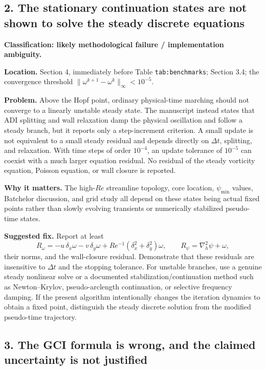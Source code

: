 \documentclass[11pt]{article}
\begin{document}
\subsection*{2. The stationary continuation states are not shown to solve the steady discrete equations}

\textbf{Classification: likely methodological failure / implementation ambiguity.}

\textbf{Location.} Section 4, immediately before Table \texttt{tab:benchmarks}; Section 3.4; the convergence threshold
$\|\omega^{k+1}-\omega^k\|_\infty<10^{-5}$.

\textbf{Problem.} Above the Hopf point, ordinary physical-time marching should not converge to a linearly unstable steady state.  The manuscript instead states that ADI splitting and wall relaxation damp the physical oscillation and follow a steady branch, but it reports only a step-increment criterion.  A small update is not equivalent to a small steady residual and depends directly on $\Delta t$, splitting, and relaxation.  With time steps of order $10^{-4}$, an update tolerance of $10^{-5}$ can coexist with a much larger equation residual.  No residual of the steady vorticity equation, Poisson equation, or wall closure is reported.

\textbf{Why it matters.} The high-$Re$ streamline topology, core location, $\psi_{\min}$ values, Batchelor discussion, and grid study all depend on these states being actual fixed points rather than slowly evolving transients or numerically stabilized pseudo-time states.

\textbf{Suggested fix.} Report at least
\[
R_\omega=-u\,\delta_x\omega-v\,\delta_y\omega
             +Re^{-1}(\delta_x^2+\delta_y^2)\omega,
\qquad
R_\psi=\nabla_h^2\psi+\omega,
\]
their norms, and the wall-closure residual.  Demonstrate that these residuals are insensitive to $\Delta t$ and the stopping tolerance.  For unstable branches, use a genuine steady nonlinear solve or a documented stabilization/continuation method such as Newton--Krylov, pseudo-arclength continuation, or selective frequency damping.  If the present algorithm intentionally changes the iteration dynamics to obtain a fixed point, distinguish the steady discrete solution from the modified pseudo-time trajectory.

\subsection*{3. The GCI formula is wrong, and the claimed uncertainty is not justified}
\end{document}
